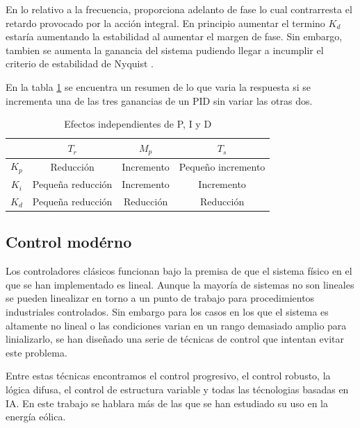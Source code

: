 \documentclass{book}
\begin{document}
En lo relativo a la frecuencia, proporciona adelanto de fase lo cual contrarresta el retardo provocado por la acci\'on integral. En principio aumentar el termino $K_d$ estar\'ia aumentando la estabilidad al aumentar el margen de fase. Sin embargo, tambien se aumenta la ganancia del sistema pudiendo llegar a incumplir el criterio de estabilidad de Nyquist \cite{PIDtunning}.\par

En la tabla \ref{ta:tuning} se encuentra un resumen de lo que varia la respuesta si se incrementa una de las tres ganancias de un PID sin variar las otras dos. \par

\begin{table}[h!]
\centering
\caption{Efectos independientes de P, I y D \cite{PIDtunning}}
\label{ta:tuning}
\begin{tabular}{c|ccc}
	 & $T_r$    & $M_p$ & $T_s$ \\ \hline
$K_p$         & Reducci\'on   & Incremento     & Pequeño incremento          \\
$K_i$        & Pequeña reducci\'on & Incremento       & Incremento          \\
$K_d$        & Pequeña reducci\'on & Reducci\'on     & Reducci\'on      
\end{tabular}
\end{table}


	\subsection{Control mod\'erno}

Los controladores cl\'asicos funcionan bajo la premisa de que el sistema f\'isico en el que se han implementado es lineal. Aunque la mayor\'ia de sistemas no son lineales se pueden linealizar en torno a un punto de trabajo para procedimientos industriales controlados. Sin embargo para los casos en los que el sistema es altamente no lineal o las condiciones varian en un rango demasiado amplio para linializarlo, se han diseñado una serie de t\'ecnicas de control que intentan evitar este problema.  \par

Entre estas t\'ecnicas encontramos el control progresivo, el control robusto, la l\'ogica difusa, el control de estructura variable y todas las t\'ecnologias basadas en IA. En este trabajo se hablara m\'as de las que se han estudiado su uso en la energ\'ia e\'olica. \par
\end{document}
